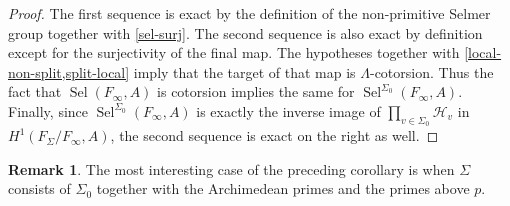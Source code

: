 \documentclass[12 pt]{amsart}
\theoremstyle{plain}
\theoremstyle{definition}
\newtheorem{rem}[thm]{Remark}
\numberwithin{equation}{section}
\numberwithin{table}{section}
\begin{document}
\begin{proof}
The first sequence is exact by the definition of the non-primitive Selmer group together with \cref{sel-surj}. The second sequence is also exact by definition except for the surjectivity of the final map. The hypotheses together with \cref{local-non-split,split-local} imply that the target of that map is $\Lambda$-cotorsion. Thus the fact that $\operatorname{Sel}(F_\infty,A)$ is cotorsion implies the same for $\operatorname{Sel}^{\Sigma_0}(F_\infty,A)$. Finally, since $\operatorname{Sel}^{\Sigma_0}(F_\infty,A)$ is exactly the inverse image of $\prod_{v\in\Sigma_0}\mathcal{H}_v$ in $H^1(F_\Sigma/F_\infty,A)$, the second sequence is exact on the right as well.
\end{proof}
\begin{rem}
The most interesting case of the preceding corollary is when $\Sigma$ consists of $\Sigma_0$ together with the Archimedean primes and the primes above $p$.
\end{rem}
\end{document}

